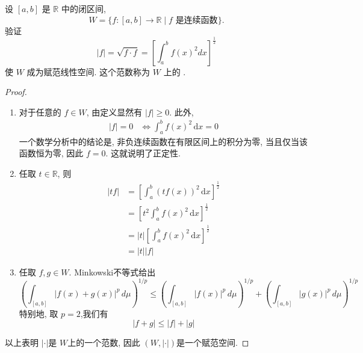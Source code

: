 \documentclass[../main.tex]{subfiles}
\begin{document}
\begin{exercise}{}{}
    设 $[a, b]$ 是 $\mathbb{R}$ 中的闭区间,
$$W = \{f:[a, b] \to \mathbb{R} \mid f \text{ 是连续函数}\}.$$
验证
$$|f| = \sqrt{f \cdot f} = \left[ \int_a^b f(x)^2 dx \right]^{\frac{1}{2}}$$
使 $W$ 成为赋范线性空间. 这个范数称为 $W$ 上的 .
\end{exercise}
\begin{proof}
      \begin{enumerate}
        \item 对于任意的 \(  f \in W  \), 由定义显然有 \(  \left| f \right|\ge 0   \). 此外, \[
        \begin{aligned}
        \left| f \right|= 0&\iff  \int_{a}^{b}f\left( x \right)^{2}\,\mathrm{d} x= 0   
        \end{aligned}
        \]  一个数学分析中的结论是, 非负连续函数在有限区间上的积分为零, 当且仅当该函数恒为零, 因此 \(  f= 0  \). 这就说明了正定性. 
        \item  任取 \(  t\in \mathbb{R}   \), 则 \[
        \begin{aligned}
        \left| tf \right|&= \left[ \int_{a}^{b}\left( tf \left( x \right)  \right)^{2}\,\mathrm{d} x  \right]^{\frac{1}{2}}\\ 
         &=  \left[ t^{2}\int_{a}^{b}f\left( x \right)^{2}\,\mathrm{d} x  \right]^{\frac{1}{2}}\\ 
          &= \left| t \right|\left[ \int_{a}^{b}f\left( x \right)^{2}\,\mathrm{d} x  \right]^{\frac{1}{2}}\\ 
           &= \left| t \right|\left| f \right|        
        \end{aligned}
        \]  
        \item 任取 \(  f,g\in W  \). Minkowski不等式给出 $$\left( \int_{[a,b]} |f(x)+g(x)|^p \,d\mu \right)^{1/p} \le \left( \int_{[a,b]} |f(x)|^p \,d\mu \right)^{1/p} + \left( \int_{[a,b]} |g(x)|^p \,d\mu \right)^{1/p}$$ 特别地, 取 \(  p= 2  \),我们有 \[
        \left| f+ g \right|\le \left| f \right|+ \left| g \right|   
        \] 
    \end{enumerate}以上表明 \(  \left| \cdot  \right|   \)是  \(  W  \)上的一个范数, 因此 \(  \left( W,\left| \cdot  \right|  \right)   \)是一个赋范空间.   
\end{proof}
\end{document}
